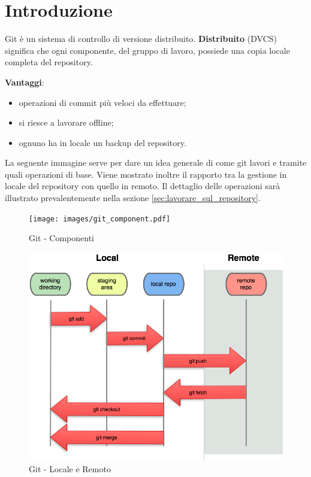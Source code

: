 \section{Introduzione} %
\label{sec:introduzione}
Git è un sistema di controllo di versione distribuito.
\newline
\textbf{Distribuito} (DVCS) significa che ogni componente, del gruppo di lavoro, possiede una copia locale completa del repository.
\newline

\noindent
\textbf{Vantaggi}:
	\begin{itemize}
		\item operazioni di commit più veloci da effettuare;
		\item si riesce a lavorare offline;
		\item ognuno ha in locale un backup del repository.
	\end{itemize}
	\noindent
	\newline
La seguente immagine serve per dare un idea generale di come git lavori e tramite quali operazioni di base. Viene mostrato inoltre il rapporto tra la gestione in locale del repository con quello in remoto. Il dettaglio delle operazioni sarà illustrato prevalentemente nella sezione \ref{sec:lavorare_sul_repository}.
	\begin{figure}[htbp]
		\centering
		\texttt{[image: images/git\_component.pdf]}
		\caption{Git - Componenti}
		\label{fig:git_componenti}
	\end{figure}
	\begin{figure}[htbp]
		\centering
		\includegraphics[scale=1.1]{images/git_local_remote.png}
		\caption{Git - Locale e Remoto}
		\label{fig:git_locale_e_remoto}
	\end{figure}


